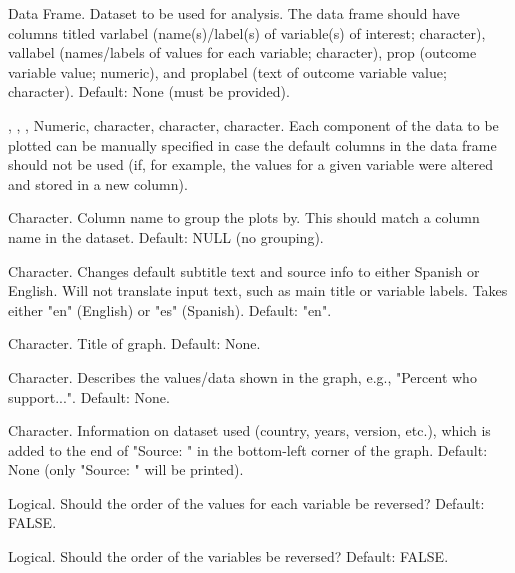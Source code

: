 \documentclass[a4paper]{book}
\begin{document}
\begin{Arguments}
\begin{ldescription}
\item[\code{data}] Data Frame. Dataset to be used for analysis.  The data frame should have columns
titled varlabel (name(s)/label(s) of variable(s) of interest; character), vallabel (names/labels of values for each variable; character),
prop (outcome variable value; numeric), and proplabel (text of outcome variable value; character).
Default: None (must be provided).

\item[\code{outcome\_var}, \code{prop\_labels}, \code{var\_labels}, \code{value\_labels}] Numeric, character, character, character.
Each component of the data to be plotted can be manually specified in case
the default columns in the data frame should not be used (if, for example, the values for a given
variable were altered and stored in a new column).

\item[\code{xvar}] Character. Column name to group the plots by. This should match a column name in the dataset.
Default: NULL (no grouping).

\item[\code{lang}] Character.  Changes default subtitle text and source info to either Spanish or English.
Will not translate input text, such as main title or variable labels.  Takes either "en" (English)
or "es" (Spanish).  Default: "en".

\item[\code{main\_title}] Character.  Title of graph.  Default: None.

\item[\code{subtitle}] Character.  Describes the values/data shown in the graph, e.g., "Percent who support...".
Default: None.

\item[\code{source\_info}] Character.  Information on dataset used (country, years, version, etc.),
which is added to the end of "Source: " in the bottom-left corner of the graph.
Default: None (only "Source: " will be printed).

\item[\code{rev\_values}] Logical.  Should the order of the values for each variable be reversed?  Default: FALSE.

\item[\code{rev\_variables}] Logical.  Should the order of the variables be reversed?  Default: FALSE.


\end{ldescription}
\end{Arguments}
\end{document}
